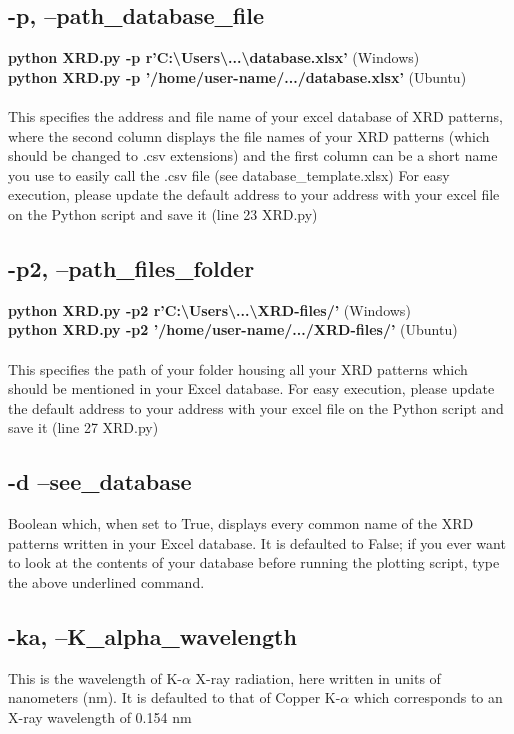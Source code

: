 \documentclass{article}
\begin{document}
\subsection{-p, --path\_database\_file} 

\textcolor{brightpink}{\textbf{python XRD.py -p r'C:\textbackslash Users\textbackslash...\textbackslash database.xlsx'} \hfill	(Windows)\\
\textbf{python XRD.py -p '/home/user-name/.../database.xlsx'} \hfill (Ubuntu)}\\\\
This specifies the address and file name of your excel database of XRD patterns, where the second column displays the file names of your XRD patterns (which should be changed to .csv extensions) and the first column can be a short name you use to easily call the .csv file (see database\_template.xlsx)
For easy execution, please update the default address to your address with your excel file on the Python script and save it (line 23 XRD.py)

\subsection{-p2, --path\_files\_folder} 
\textcolor{brightpink}{\textbf{python XRD.py -p2 r'C:\textbackslash Users\textbackslash...\textbackslash XRD-files/'} \hfill  (Windows)\\\textbf{python XRD.py -p2 '/home/user-name/.../XRD-files/'}  \hfill (Ubuntu)}\\\\
This specifies the path of your folder housing all your XRD patterns which should be mentioned in your Excel database. 
For easy execution, please update the default address to your address with your excel file on the Python script and save it (line 27 XRD.py)

\subsection{-d --see\_database} 
Boolean which, when set to True, displays every common name of the XRD patterns written in your Excel database. It is defaulted to False; if you ever want to look at the contents of your database before running the plotting script, type the above underlined command. 

\subsection{-ka, --K\_alpha\_wavelength} 
This is the wavelength of K-$\alpha$ X-ray radiation, here written in units of nanometers (nm). It is defaulted to that of Copper K-$\alpha$ which corresponds to an X-ray wavelength of 0.154 nm
\end{document}
